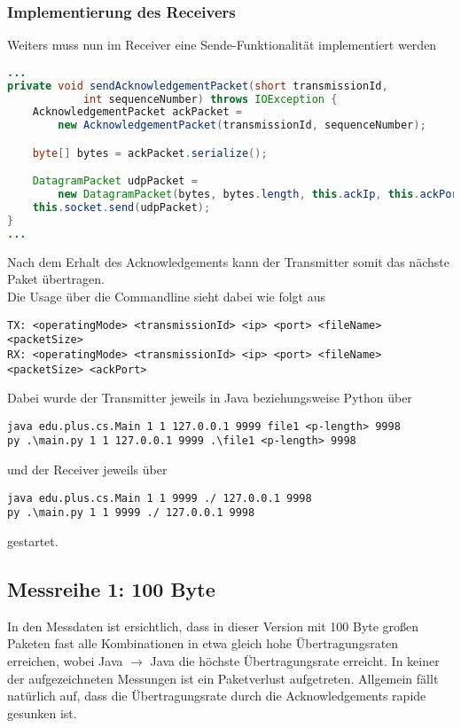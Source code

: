 \documentclass{article}
\begin{document}
    \subsubsection*{Implementierung des Receivers}
    Weiters muss nun im Receiver eine Sende-Funktionalität implementiert werden

    \begin{lstlisting}[language=Java]
...
private void sendAcknowledgementPacket(short transmissionId,
            int sequenceNumber) throws IOException {
    AcknowledgementPacket ackPacket =
        new AcknowledgementPacket(transmissionId, sequenceNumber);

    byte[] bytes = ackPacket.serialize();

    DatagramPacket udpPacket =
        new DatagramPacket(bytes, bytes.length, this.ackIp, this.ackPort);
    this.socket.send(udpPacket);
}
...
    \end{lstlisting}

    Nach dem Erhalt des Acknowledgements kann der Transmitter somit das nächste Paket übertragen.\\

    Die Usage über die Commandline sieht dabei wie folgt aus
    \begin{lstlisting}
TX: <operatingMode> <transmissionId> <ip> <port> <fileName>
<packetSize>
RX: <operatingMode> <transmissionId> <ip> <port> <fileName>
<packetSize> <ackPort>
    \end{lstlisting}

    Dabei wurde der Transmitter jeweils in Java beziehungsweise Python über
    \begin{lstlisting}
java edu.plus.cs.Main 1 1 127.0.0.1 9999 file1 <p-length> 9998
py .\main.py 1 1 127.0.0.1 9999 .\file1 <p-length> 9998
    \end{lstlisting}und der Receiver jeweils über
    \begin{lstlisting}
java edu.plus.cs.Main 1 1 9999 ./ 127.0.0.1 9998
py .\main.py 1 1 9999 ./ 127.0.0.1 9998
    \end{lstlisting}
    gestartet.

    \subsection{Messreihe 1: 100 Byte}
    In den Messdaten ist ersichtlich, dass in dieser Version mit 100 Byte großen Paketen fast alle Kombinationen in etwa
    gleich hohe Übertragungsraten erreichen, wobei Java $\rightarrow$ Java die höchste Übertragungsrate erreicht.
    In keiner der aufgezeichneten Messungen ist ein Paketverlust aufgetreten.
    Allgemein fällt natürlich auf, dass die Übertragungsrate durch die Acknowledgements rapide gesunken ist.
\end{document}
